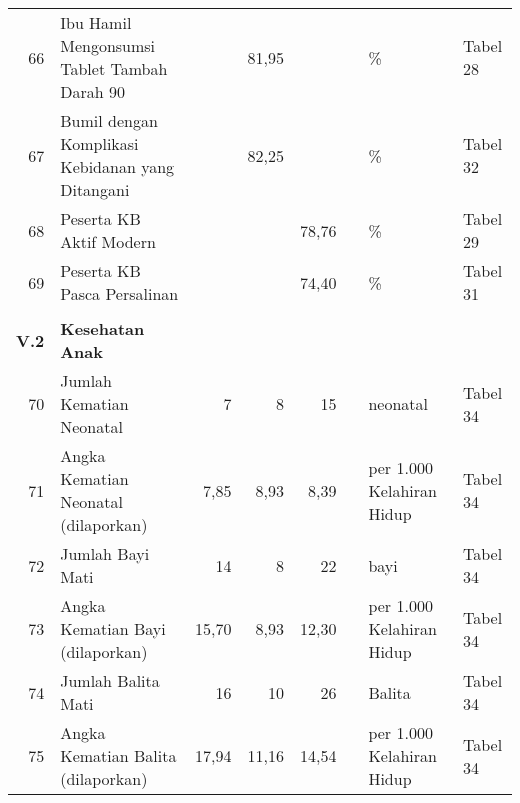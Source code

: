 \begin{small}
\begin{longtable}{rY{12em}rrrrY{5em}Y{5em}}
	 66 & Ibu Hamil Mengonsumsi Tablet Tambah Darah 90                                &        &  81,95 &                    &          & \%                             & Tabel 28 \\
	 67 & Bumil dengan Komplikasi Kebidanan yang Ditangani                            &        &  82,25 &                    &          & \%                             & Tabel 32 \\
	 68 & Peserta KB Aktif Modern                                                     &        &        &              78,76 &          & \%                             & Tabel 29 \\
	 69 & Peserta KB Pasca Persalinan                                                 &        &        &              74,40 &          & \%                             & Tabel 31 \\
	 &                                                                                &        &        &                    &          &                                &          \\
	\textbf{V.2} & \textbf{Kesehatan Anak}                                            &        &        &                    &          &                                &          \\
	 70 & Jumlah Kematian Neonatal                                                    &      7 &      8 &                 15 &          & neonatal                       & Tabel 34 \\
	 71 & Angka Kematian Neonatal (dilaporkan)                                        &   7,85 &   8,93 &               8,39 &          & per 1.000 Kelahiran Hidup      & Tabel 34 \\
	 72 & Jumlah Bayi Mati                                                            &     14 &      8 &                 22 &          & bayi                           & Tabel 34 \\
	 73 & Angka Kematian Bayi (dilaporkan)                                            &  15,70 &   8,93 &              12,30 &          & per 1.000 Kelahiran Hidup      & Tabel 34 \\
	 74 & Jumlah Balita Mati                                                          &     16 &     10 &                 26 &          & Balita                         & Tabel 34 \\
	 75 & Angka Kematian Balita (dilaporkan)                                          &  17,94 &  11,16 &              14,54 &          & per 1.000 Kelahiran Hidup      & Tabel 34 \\

\end{longtable}
\end{small}
